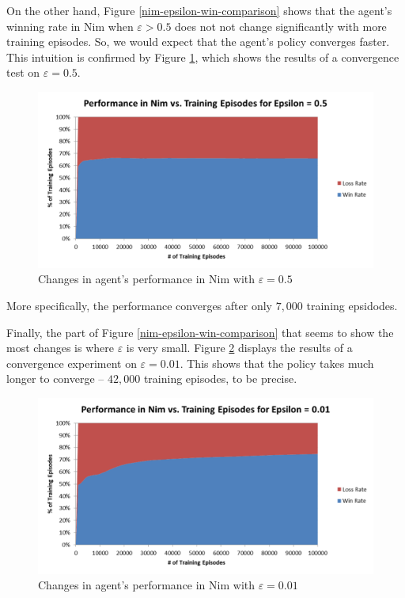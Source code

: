 \documentclass[11pt,a4paper]{report}
\begin{document}
On the other hand, Figure \ref{nim-epsilon-win-comparison} shows that the agent's winning rate in Nim when $\varepsilon > 0.5$ does not not change significantly with more training episodes. So, we would expect that the agent's policy converges faster. This intuition is confirmed by Figure \ref{nim-0-5-convergence}, which shows the results of a convergence test on $\varepsilon = 0.5$.

\begin{figure}[htbp]
	\begin{center}
		\includegraphics[width=125mm]{Nim_PerformanceResults_0_5.png}
		\caption{Changes in agent's performance in Nim with $\varepsilon = 0.5$}
		\label{nim-0-5-convergence}
	\end{center}
\end{figure}

More specifically, the performance converges after only $7,000$ training epsidodes.

Finally, the part of Figure \ref{nim-epsilon-win-comparison} that seems to show the most changes is where $\varepsilon$ is very small. Figure \ref{nim-0-01-convergence} displays the results of a convergence experiment on $\varepsilon = 0.01$. This shows that the policy takes much longer to converge -- $42,000$ training episodes, to be precise.

\begin{figure}[htbp]
	\begin{center}
		\includegraphics[width=125mm]{Nim_PerformanceResults_0_01.png}
		\caption{Changes in agent's performance in Nim with $\varepsilon = 0.01$}
		\label{nim-0-01-convergence}
	\end{center}
\end{figure}
\end{document}
